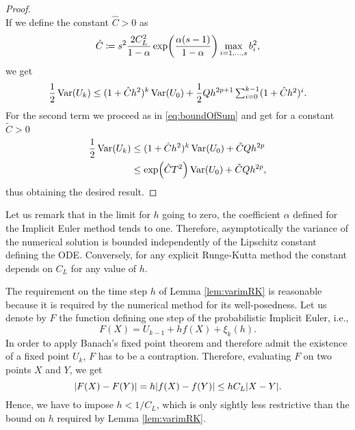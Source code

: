 \begin{proof}
\begin{equation}
\end{equation}
If we define the constant $\hat C > 0$ as 
\begin{equation}
\hat C \coloneqq s^2\frac{2C_L^2}{1 - \alpha}\exp(\frac{\alpha(s-1)}{1-\alpha})\max_{i=1,\ldots,s} b_i^2,
\end{equation}
we get
\begin{equation}
\frac{1}{2}\operatorname{Var}(U_k) \leq (1 + \hat C h^2)^k \operatorname{Var}(U_0) + \frac{1}{2} Qh^{2p+1}\textstyle\sum_{i=0}^{k-1} (1 + \hat C h^2)^i.
\end{equation}
For the second term we proceed as in \eqref{eq:boundOfSum} and get for a constant $\tilde C > 0$ \\
\begin{equation}
\begin{aligned}
\frac{1}{2}\operatorname{Var}(U_k) &\leq (1 + \hat C h^2)^k \operatorname{Var}(U_0) + \tilde C Q h^{2p} \\
&\leq \exp(\hat C T^2)\operatorname{Var}(U_0) + \tilde C Q h^{2p},
\end{aligned}
\end{equation}
thus obtaining the desired result.
\end{proof}
\begin{remark} Let us remark that in the limit for $h$ going to zero, the coefficient $\alpha$ defined for the Implicit Euler method tends to one. Therefore, asymptotically the variance of the numerical solution is bounded independently of the Lipschitz constant defining the ODE. Conversely, for any explicit Runge-Kutta method the constant depends on $C_L$ for any value of $h$.
\end{remark}
\begin{remark} The requirement on the time step $h$ of Lemma \ref{lem:varimRK} is reasonable because it is required by the numerical method for its well-posedness. Let us denote by $F$ the function defining one step of the probabilistic Implicit Euler, i.e., 
	\begin{equation}
	F(X) = U_{k-1} + hf(X) + \xi_k(h).
	\end{equation}
	In order to apply Banach's fixed point theorem and therefore admit the existence of a fixed point $U_{k}$, $F$ has to be a contraption. Therefore, evaluating $F$ on two points $X$ and $Y$, we get
	\begin{equation}
	\abs{F(X) - F(Y)} = h\abs{f(X) - f(Y)} \leq hC_L \abs{X - Y}.
	\end{equation}
	Hence, we have to impose $h < 1 / C_L$, which is only sightly less restrictive than the bound on $h$ required by Lemma \ref{lem:varimRK}. 
\end{remark}

